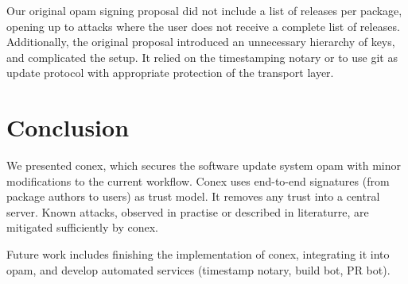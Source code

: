 \documentclass[nocopyrightspace]{sigplanconf}
\begin{document}
Our original opam signing proposal did not include a list of releases per package, opening up to attacks where the user does not receive a complete list of releases.
Additionally, the original proposal introduced an unnecessary hierarchy of keys, and complicated the setup.
It relied on the timestamping notary or to use git as update protocol with appropriate protection of the transport layer.

\section{Conclusion} \label{sec:conclusion}
We presented conex, which secures the software update system opam with minor modifications to the current workflow.
Conex uses end-to-end signatures (from package authors to users) as trust model.
It removes any trust into a central server.
Known attacks, observed in practise or described in literaturre, are mitigated sufficiently by conex.

Future work includes finishing the implementation of conex, integrating it into opam, and develop automated services (timestamp notary, build bot, PR bot).



\end{document}
